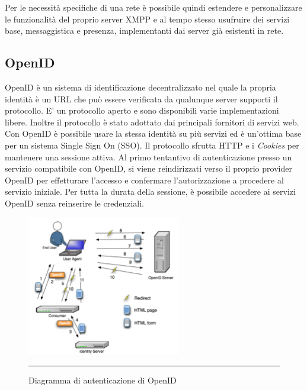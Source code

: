 Per le necessità specifiche di una rete è possibile quindi estendere e
personalizzare le funzionalità del proprio server XMPP e al tempo
stesso usufruire dei servizi base, messaggistica e presenza,
implementanti dai server già esistenti in rete.

\subsection{OpenID}
OpenID è un sistema di identificazione decentralizzato nel quale la
propria identità è un URL che può essere verificata da qualunque
server supporti il protocollo. E' un protocollo aperto e sono
disponibili varie implementazioni libere. Inoltre il protocollo è
stato adottato dai principali fornitori di servizi web. Con OpenID è
possibile usare la stessa identità su più servizi ed è un'ottima base
per un sistema Single Sign On (SSO). Il protocollo sfrutta HTTP e i
\emph{Cookies} per mantenere una sessione attiva. Al primo tentantivo
di autenticazione presso un servizio compatibile con OpenID, si viene
reindirizzati verso il proprio provider OpenID per effetturare
l'accesso e confermare l'autorizzazione a procedere al servizio
iniziale. Per tutta la durata della sessione, è possibile accedere ai
servizi OpenID senza reinserire le credenziali.

\begin{figure}[htbp]
  \centering
  \includegraphics[width=0.6\textwidth]{./Figure/OpenID_Scenario.pdf}
  \rule{35em}{0.5pt}
  \caption[Diagramma di autenticazione di OpenID]{Diagramma di autenticazione di OpenID}
  \label{fig:OpenID}
\end{figure}



